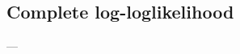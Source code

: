 \documentclass[mestrado, qualificacao]{packages/icmc}
\begin{document}
\postextual




% 


\begin{apendicesenv}

    \chapter{Complete log-loglikelihood}
    \label{chapter:otimizacao_convexa}
    


\end{apendicesenv}
---




%     

\end{document}
